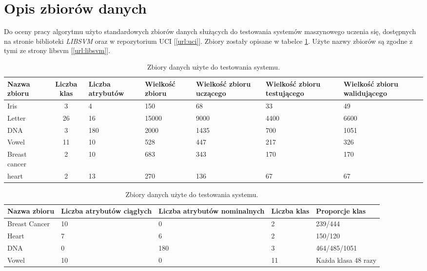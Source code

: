 \section{Opis zbiorów danych}
	Do oceny pracy algorytmu użyto standardowych zbiorów danych służących do testowania systemów maszynowego uczenia się, dostępnych na stronie biblioteki \emph{LIBSVM} \cite{chang_libsvm:_2011}  oraz w repozytorium UCI  [\ref{url:uci}]. Zbiory zostały opisane w tabelce \ref{tab:datasets}. Użyte nazwy zbiorów są zgodne z tymi ze strony libsvm [\ref{url:libsvm}].

\begin{table}[ht]
	\caption{Zbiory danych użyte do testowania systemu.\label{tab:datasets}} 	
	\begin{tabular}{|p{2cm}|c|p{1.5cm}|p{1.5cm}|p{1.5cm}|p{1.5cm}|p{1.5cm}|}
		\hline 
		Nazwa zbioru & Liczba klas & \hspace{0pt} Liczba atrybutów & \hspace{0pt} Wielkość zbioru & \hspace{0pt} Wielkość zbioru uczącego & \hspace{0pt}Wielkość zbioru testującego & \hspace{0pt} Wielkość zbioru walidującego \\
		\hline 
		Iris & 3 & 4 & 150 & 68 & 33 & 49  \\ 
		\hline 
		Letter & 26 & 16 & 15000 & 9000 & 4400 & 6600\\ 
		\hline 
		DNA & 3 & 180 & 2000 & 1435 & 700 & 1051 \\ 
		\hline 
		Vowel & 11 & 10 & 528 & 447 & 217 & 326 \\ 
		\hline
		Breast cancer & 2 & 10 & 683 & 343 & 170 & 170 \\ 
		\hline
		heart & 2 & 13 & 270 & 136 & 67 & 67 \\ 
		\hline
	\end{tabular} 	
\end{table}

\begin{table}[ht]
\caption{Zbiory danych użyte do testowania systemu.\label{tab:datasets2}} 	
	\begin{tabular}{|p{2.5cm}|p{2.5cm}|p{2.5cm}|p{1.5cm}|p{3cm}|}
	\hline 
	Nazwa zbioru & Liczba atrybutów ciągłych & Liczba atrybutów nominalnych & Liczba klas & Proporcje klas \\ 
	\hline 
	Breast Cancer & 10 & 0 & 2 & 239/444 \\ 
	\hline 
	Heart  & 7 & 6 & 2 & 150/120  \\ 
	\hline 
	DNA & 0 & 180 & 3 & 464/485/1051  \\ 
	\hline 
	Vowel & 10 & 0 & 11 & Każda klasa 48 razy \\ 
	\hline 
	\end{tabular} 
\end{table}

